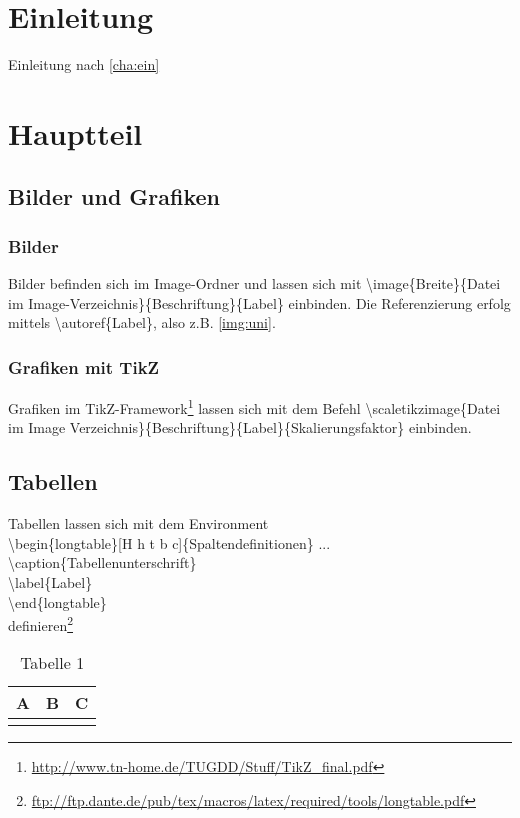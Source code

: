 \chapter{Einleitung}\label{cha:ein}
Einleitung nach \autoref{cha:ein}

\chapter{Hauptteil}\label{cha:haupt}
\section{Bilder und Grafiken}\label{sec:grafiken}
\subsection{Bilder}\label{subsec:bilder}
Bilder befinden sich im Image-Ordner und lassen sich mit \textbackslash image\{Breite\}\{Datei im Image-Verzeichnis\}\{Beschriftung\}\{Label\} einbinden.  Die Referenzierung erfolg mittels \textbackslash autoref\{Label\}, also z.B. \autoref{img:uni}.
\subsection{Grafiken mit TikZ}
Grafiken im TikZ-Framework\footnote{\url{http://www.tn-home.de/TUGDD/Stuff/TikZ_final.pdf}} lassen sich mit dem Befehl \textbackslash scaletikzimage\{Datei im Image Verzeichnis\}\{Beschriftung\}\{Label\}\{Skalierungsfaktor\} einbinden. 
\section{Tabellen}
Tabellen lassen sich mit dem Environment\\
\textbackslash begin\{longtable\}[H h t b c]\{Spaltendefinitionen\} ...\\
\qquad\qquad \textbackslash caption\{Tabellenunterschrift\}\\
\qquad\qquad \textbackslash label\{Label\}\\
\textbackslash end\{longtable\}\\
 definieren\footnote{\url{ftp://ftp.dante.de/pub/tex/macros/latex/required/tools/longtable.pdf}}\\
\begin{longtable}[H]{|p{}|p{}|p{}|}
\hline
A&B&C\\
\hline
\caption{Tabelle 1}
\label{tab:tab1}
\end{longtable}
